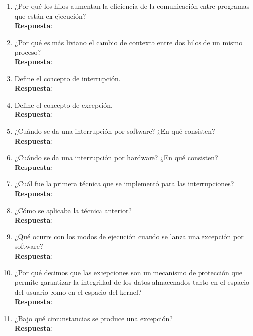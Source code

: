 \documentclass[a4paper,12pt]{article}
\begin{document}
\begin{enumerate}[label=\textbf{Pregunta \arabic*.}]
    \item ¿Por qué los hilos aumentan la eficiencia de la comunicación entre programas que están en ejecución? \\
    \textbf{Respuesta:} 
    

    \item ¿Por qué es más liviano el cambio de contexto entre dos hilos de un mismo proceso? \\
    \textbf{Respuesta:} 
    

    \item Define el concepto de interrupción. \\
    \textbf{Respuesta:} 
    

    \item Define el concepto de excepción. \\
    \textbf{Respuesta:} 
    

    \item ¿Cuándo se da una interrupción por software? ¿En qué consisten? \\
    \textbf{Respuesta:} 
    

    \item ¿Cuándo se da una interrupción por hardware? ¿En qué consisten? \\
    \textbf{Respuesta:} 
    

    \item ¿Cuál fue la primera técnica que se implementó para las interrupciones? \\
    \textbf{Respuesta:} 
    

    \item ¿Cómo se aplicaba la técnica anterior? \\
    \textbf{Respuesta:} 
    

    \item ¿Qué ocurre con los modos de ejecución cuando se lanza una excepción por software? \\
    \textbf{Respuesta:} 
    

    \item ¿Por qué decimos que las excepciones son un mecanismo de protección que permite garantizar la integridad de los datos almacenados tanto en el espacio del usuario como en el espacio del kernel? \\
    \textbf{Respuesta:} 
    

    \item ¿Bajo qué circunstancias se produce una excepción? \\
    \textbf{Respuesta:} 
    



\end{enumerate}
\end{document}
